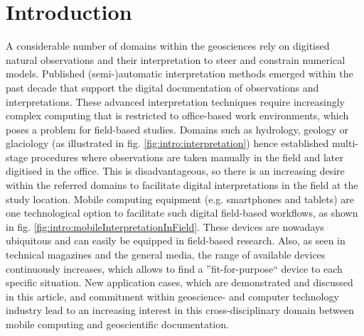 \documentclass[review]{elsarticle}
\begin{document}
\linenumbers

\section{Introduction}
\label{sec:introduction}

A considerable number of domains within the geosciences rely on digitised natural observations and their interpretation to steer and constrain numerical models. Published (semi-)automatic interpretation methods \cite{Nyberg2015,Ruiu2015} emerged within the past decade that support the digital documentation of observations and interpretations. These advanced interpretation techniques require increasingly complex computing that is restricted to office-based work environments, which poses a problem for field-based studies. Domains such as hydrology, geology or glaciology (as illustrated in fig. \ref{fig:intro:interpretation}) hence established multi-stage procedures where observations are taken manually in the field and later digitised in the office. This is disadvantageous, so there is an increasing desire within the referred domains to facilitate digital interpretations in the field at the study location. Mobile computing equipment (e.g. smartphones and tablets) are one technological option to facilitate such digital field-based workflows, as shown in fig. \ref{fig:intro:mobileInterpretationInField}. These devices are nowadays ubiquitous and can easily be equipped in field-based research. Also, as seen in technical magazines and the general media, the range of available devices continuously increases, which allows to find a ''fit-for-purpose`` device to each specific situation. New application cases, which are demonstrated and discussed in this article, and commitment within geoscience- and computer technology industry lead to an increasing interest in this cross-disciplinary domain between mobile computing and geoscientific documentation.

\end{document}
